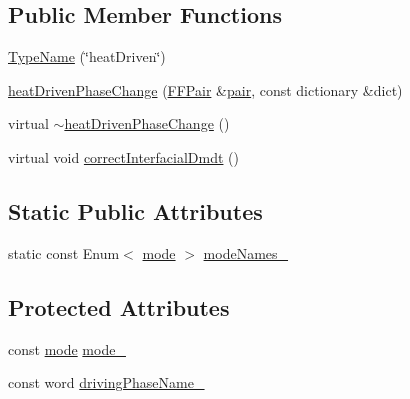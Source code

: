 \subsection*{Public Member Functions}
\begin{DoxyCompactItemize}
\item 
\hyperlink{classFoam_1_1phaseChangeModels_1_1heatDrivenPhaseChange_a7120449d5e107c56f9992872498febae}{Type\+Name} (\char`\"{}heat\+Driven\char`\"{})
\item 
\hyperlink{classFoam_1_1phaseChangeModels_1_1heatDrivenPhaseChange_a35eafa8fc75198fbe94883617d7da57a}{heat\+Driven\+Phase\+Change} (\hyperlink{classFoam_1_1FFPair}{F\+F\+Pair} \&\hyperlink{classFoam_1_1phaseChangeModel_a826deac453e9ba7c6fcda90d7b6b7709}{pair}, const dictionary \&dict)
\item 
virtual \hyperlink{classFoam_1_1phaseChangeModels_1_1heatDrivenPhaseChange_a8269bb176e3900e1add8ab309bad63a5}{$\sim$heat\+Driven\+Phase\+Change} ()
\item 
virtual void \hyperlink{classFoam_1_1phaseChangeModels_1_1heatDrivenPhaseChange_a26b9e463af1a7ec39a18891734bd0759}{correct\+Interfacial\+Dmdt} ()
\end{DoxyCompactItemize}
\subsection*{Static Public Attributes}
\begin{DoxyCompactItemize}
\item 
static const Enum$<$ \hyperlink{classFoam_1_1phaseChangeModels_1_1heatDrivenPhaseChange_a1a6b6fb557d8d37d59700faf4e4c9167}{mode} $>$ \hyperlink{classFoam_1_1phaseChangeModels_1_1heatDrivenPhaseChange_a0d2fbca39ae750d79340f73beeab15ff}{mode\+Names\+\_\+}
\end{DoxyCompactItemize}
\subsection*{Protected Attributes}
\begin{DoxyCompactItemize}
\item 
const \hyperlink{classFoam_1_1phaseChangeModels_1_1heatDrivenPhaseChange_a1a6b6fb557d8d37d59700faf4e4c9167}{mode} \hyperlink{classFoam_1_1phaseChangeModels_1_1heatDrivenPhaseChange_aad715726d4354b1f8caf14cbae4a5200}{mode\+\_\+}
\item 
const word \hyperlink{classFoam_1_1phaseChangeModels_1_1heatDrivenPhaseChange_a7c4fcdfff2b2905fe513bfe02a8d64b7}{driving\+Phase\+Name\+\_\+}
\end{DoxyCompactItemize}
